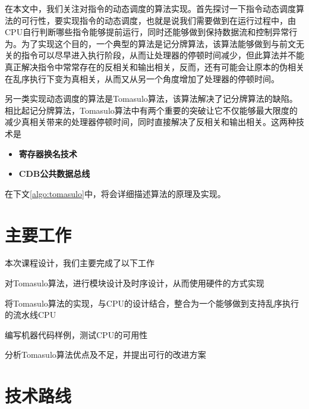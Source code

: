 \documentclass[twoside]{article}
\begin{document}
在本文中，我们关注对指令的动态调度的算法实现。首先探讨一下指令动态调度算法的可行性，要实现指令的动态调度，也就是说我们需要做到在运行过程中，由CPU自行判断哪些指令能够提前运行，同时还能够做到保持数据流和控制异常行为。为了实现这个目的，一个典型的算法是记分牌算法，该算法能够做到与前文无关的指令可以尽早进入执行阶段，从而让处理器的停顿时间减少，但此算法并不能真正解决指令中常常存在的反相关和输出相关，反而，还有可能会让原本的伪相关在乱序执行下变为真相关，从而又从另一个角度增加了处理器的停顿时间。

另一类实现动态调度的算法是Tomasulo算法，该算法解决了记分牌算法的缺陷。相比起记分牌算法，Tomasulo算法中有两个重要的突破\cite{wiki:tomasulo}让它不仅能够最大限度的减少真相关带来的处理器停顿时间，同时直接解决了反相关和输出相关。这两种技术是
\begin{itemize}
	\item \textbf{寄存器换名技术} 
	\item \textbf{CDB公共数据总线}
\end{itemize}
在下文\autoref{algo:tomasulo}中，将会详细描述算法的原理及实现。



\section{主要工作}
本次课程设计，我们主要完成了以下工作
\begin{compactitem}
	\item 对Tomasulo算法，进行模块设计及时序设计，从而使用硬件的方式实现
	\item 将Tomasulo算法的实现，与CPU的设计结合，整合为一个能够做到支持乱序执行的流水线CPU
	\item 编写机器代码样例，测试CPU的可用性
	\item 分析Tomasulo算法优点及不足，并提出可行的改进方案
\end{compactitem}

\section{技术路线}
\end{document}
